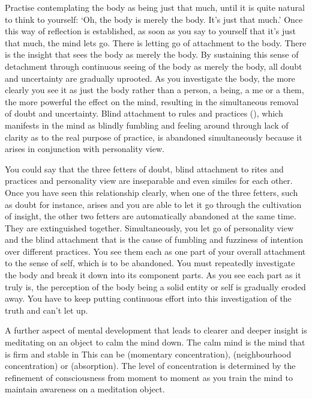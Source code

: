 Practise contemplating the body as being just that much, until it is quite natural to think to yourself: `Oh, the body is merely the body. It's just that much.' Once this way of reflection is established, as soon as you say to yourself that it's just that much, the mind lets go. There is letting go of attachment to the body. There is the insight that sees the body as merely the body. By sustaining this sense of detachment through continuous seeing of the body as merely the body, all doubt and uncertainty are gradually uprooted. As you investigate the body, the more clearly you see it as just the body rather than a person, a being, a me or a them, the more powerful the effect on the mind, resulting in the simultaneous removal of doubt and uncertainty. Blind attachment to rules and practices (), which manifests in the mind as blindly fumbling and feeling around through lack of clarity as to the real purpose of practice, is abandoned simultaneously because it arises in conjunction with personality view.

You could say that the three fetters of doubt, blind attachment to rites and practices and personality view are inseparable and even similes for each other. Once you have seen this relationship clearly, when one of the three fetters, such as doubt for instance, arises and you are able to let it go through the cultivation of insight, the other two fetters are automatically abandoned at the same time. They are extinguished together. Simultaneously, you let go of personality view and the blind attachment that is the cause of fumbling and fuzziness of intention over different practices. You see them each as one part of your overall attachment to the sense of self, which is to be abandoned. You must repeatedly investigate the body and break it down into its component parts. As you see each part as it truly is, the perception of the body being a solid entity or self is gradually eroded away. You have to keep putting continuous effort into this investigation of the truth and can't let up. 

A further aspect of mental development that leads to clearer and deeper insight is meditating on an object to calm the mind down. The calm mind is the mind that is firm and stable in  This can be  (momentary concentration),  (neighbourhood concentration) or  (absorption). The level of concentration is determined by the refinement of consciousness from moment to moment as you train the mind to maintain awareness on a meditation object. 

